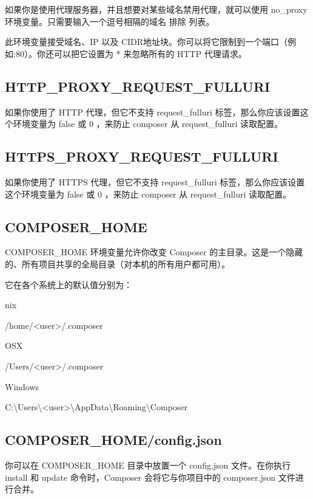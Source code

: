 如果你是使用代理服务器，并且想要对某些域名禁用代理，就可以使用 no\_proxy 环境变量。只需要输入一个逗号相隔的域名 排除 列表。

此环境变量接受域名、IP 以及 CIDR地址块。你可以将它限制到一个端口（例如:80）。你还可以把它设置为 * 来忽略所有的 HTTP 代理请求。


\subsection{HTTP\_PROXY\_REQUEST\_FULLURI}

如果你使用了 HTTP 代理，但它不支持 request\_fulluri 标签，那么你应该设置这个环境变量为 false 或 0 ，来防止 composer 从 request\_fulluri 读取配置。

\subsection{HTTPS\_PROXY\_REQUEST\_FULLURI}

如果你使用了 HTTPS 代理，但它不支持 request\_fulluri 标签，那么你应该设置这个环境变量为 false 或 0 ，来防止 composer 从 request\_fulluri 读取配置。


\subsection{COMPOSER\_HOME}

COMPOSER\_HOME 环境变量允许你改变 Composer 的主目录。这是一个隐藏的、所有项目共享的全局目录（对本机的所有用户都可用）。

它在各个系统上的默认值分别为：

\begin{compactitem}
\item *nix

/home/<user>/.composer
\item OSX

/Users/<user>/.composer
\item Windows

C:\textbackslash Users\textbackslash <user>\textbackslash AppData\textbackslash Roaming\textbackslash Composer
\end{compactitem}

\subsection{COMPOSER\_HOME/config.json}

你可以在 COMPOSER\_HOME 目录中放置一个 config.json 文件。在你执行 install 和 update 命令时，Composer 会将它与你项目中的 composer.json 文件进行合并。

